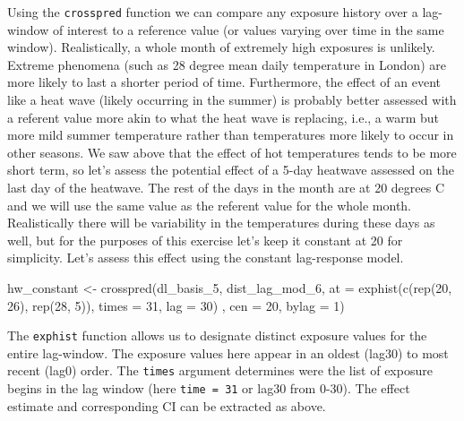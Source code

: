 \documentclass[
]{book}
\newenvironment{Shaded}{\begin{snugshade}}{\end{snugshade}}
\newcommand{\AttributeTok}[1]{\textcolor[rgb]{0.77,0.63,0.00}{#1}}
\newcommand{\DecValTok}[1]{\textcolor[rgb]{0.00,0.00,0.81}{#1}}
\newcommand{\FunctionTok}[1]{\textcolor[rgb]{0.00,0.00,0.00}{#1}}
\newcommand{\NormalTok}[1]{#1}
\newcommand{\OtherTok}[1]{\textcolor[rgb]{0.56,0.35,0.01}{#1}}
\newcommand{\SpecialCharTok}[1]{\textcolor[rgb]{0.00,0.00,0.00}{#1}}
\begin{document}
Using the \texttt{crosspred} function we can compare any exposure history over a lag-window of interest to a reference value (or values varying over time in the same window). Realistically, a whole month of extremely high exposures is unlikely. Extreme phenomena (such as 28 degree mean daily temperature in London) are more likely to last a shorter period of time. Furthermore, the effect of an event like a heat wave (likely occurring in the summer) is probably better assessed with a referent value more akin to what the heat wave is replacing, i.e., a warm but more mild summer temperature rather than temperatures more likely to occur in other seasons. We saw above that the effect of hot temperatures tends to be more short term, so let's assess the potential effect of a 5-day heatwave assessed on the last day of the heatwave. The rest of the days in the month are at 20 degrees C and we will use the same value as the referent value for the whole month. Realistically there will be variability in the temperatures during these days as well, but for the purposes of this exercise let's keep it constant at 20 for simplicity. Let's assess this effect using the constant lag-response model.

\begin{Shaded}
\begin{Highlighting}[]
\NormalTok{hw\_constant }\OtherTok{\textless{}{-}} \FunctionTok{crosspred}\NormalTok{(dl\_basis\_5, dist\_lag\_mod\_6, }
                         \AttributeTok{at =} \FunctionTok{exphist}\NormalTok{(}\FunctionTok{c}\NormalTok{(}\FunctionTok{rep}\NormalTok{(}\DecValTok{20}\NormalTok{, }\DecValTok{26}\NormalTok{), }\FunctionTok{rep}\NormalTok{(}\DecValTok{28}\NormalTok{, }\DecValTok{5}\NormalTok{)), }\AttributeTok{times =} \DecValTok{31}\NormalTok{, }\AttributeTok{lag =} \DecValTok{30}\NormalTok{) , }
                         \AttributeTok{cen =} \DecValTok{20}\NormalTok{, }\AttributeTok{bylag =} \DecValTok{1}\NormalTok{)}
\end{Highlighting}
\end{Shaded}

The \texttt{exphist} function allows us to designate distinct exposure values for the entire lag-window. The exposure values here appear in an oldest (lag30) to most recent (lag0) order. The \texttt{times} argument determines were the list of exposure begins in the lag window (here \texttt{time\ =\ 31} or lag30 from 0-30). The effect estimate and corresponding CI can be extracted as above.

\begin{Shaded}
\end{Shaded}
\end{document}
